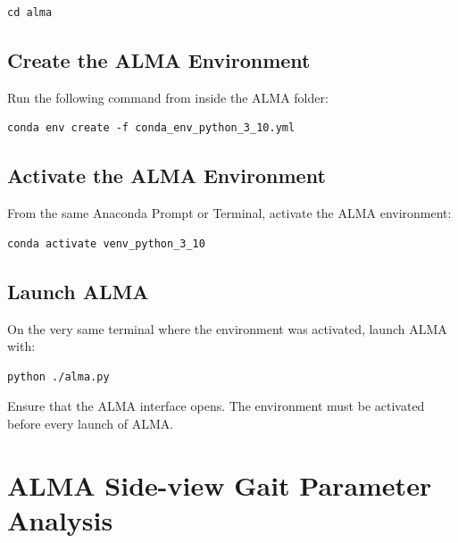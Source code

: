 \documentclass[11pt]{article}
\renewcommand{\[}{%
  \par\smallskip\noindent
  \begin{center}%
  \setlength{\fboxsep}{5pt}%
  \setlength{\fboxrule}{0.35pt}%
  \begin{lrbox}{\almaEquationBox}%
  $\displaystyle
}
\renewcommand{\]}{%
  $%
  \end{lrbox}%
  \fcolorbox{equationLine}{equationBack}{\usebox{\almaEquationBox}}%
  \end{center}%
  \smallskip\par
}
\begin{document}
\begin{tcolorbox}
\begin{verbatim}
cd alma
\end{verbatim}
\end{tcolorbox}

\subsection{Create the ALMA Environment}

Run the following command from inside the ALMA folder:

\begin{tcolorbox}
\begin{verbatim}
conda env create -f conda_env_python_3_10.yml
\end{verbatim}
\end{tcolorbox}

\subsection{Activate the ALMA Environment}

From the same Anaconda Prompt or Terminal, activate the ALMA environment:

\begin{tcolorbox}
\begin{verbatim}
conda activate venv_python_3_10
\end{verbatim}
\end{tcolorbox}

\subsection{Launch ALMA}

On the very same terminal where the environment was activated, launch ALMA with:

\begin{tcolorbox}
\begin{verbatim}
python ./alma.py
\end{verbatim}
\end{tcolorbox}

\noindent Ensure that the ALMA interface opens. The environment must be activated before every launch of ALMA. 

\section{ALMA Side-view Gait Parameter Analysis}
\end{document}
